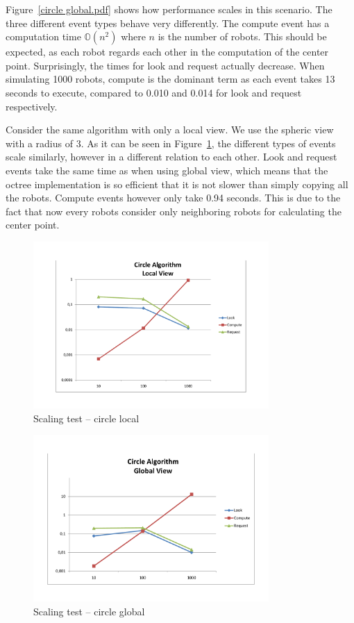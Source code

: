 Figure~\ref{circle global.pdf} shows how performance scales in this scenario. The three different event types behave very differently. The compute event has a computation time $\mathbb{O}(n^2)$ where $n$ is the number of robots. This should be expected, as each robot regards each other in the computation of the center point. Surprisingly, the times for look and request actually decrease. When simulating 1000 robots, compute is the dominant term as each event takes 13 seconds to execute, compared to 0.010 and 0.014 for look and request respectively.

Consider the same algorithm with only a local view. We use the spheric view with a radius of 3. As it can be seen in Figure~\ref{pic:scaling:circlelocal}, the different types of events scale similarly, however in a different relation to each other. Look and request events take the same time as when using global view, which means that the octree implementation is so efficient that it is not slower than simply copying all the robots. Compute events however only take 0.94 seconds. This is due to the fact that now every robots consider only neighboring robots for calculating the center point.

\begin{figure}[p]
	\begin{center}
	\includegraphics[width=0.8\textwidth]{scaling-circle-local}
	\caption{Scaling test -- circle local}
	\label{pic:scaling:circlelocal}
	\end{center}
\end{figure}

\begin{figure}[p]
	\begin{center}
	\includegraphics[width=0.8\textwidth]{scaling-circle-global}
	\caption{Scaling test -- circle global}
	\label{pic:scaling:circleglobal}
	\end{center}
\end{figure}
